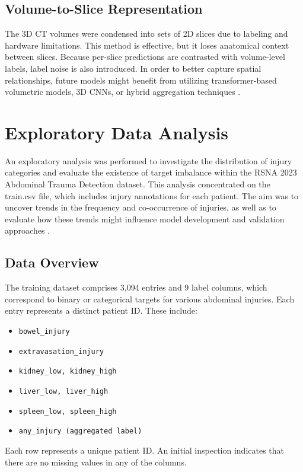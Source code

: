 \documentclass[a4paper,12pt]{article}
\begin{document}
\subsection{Volume-to-Slice Representation}
The 3D CT volumes were condensed into sets of 2D slices due to labeling and hardware limitations. This method is effective, but it loses anatomical context between slices. Because per-slice predictions are contrasted with volume-level labels, label noise is also introduced. In order to better capture spatial relationships, future models might benefit from utilizing transformer-based volumetric models, 3D CNNs, or hybrid aggregation techniques \cite{isensee2021nnunet}.

\section{Exploratory Data Analysis}
An exploratory analysis was performed to investigate the distribution of injury categories and evaluate the existence of target imbalance within the RSNA 2023 Abdominal Trauma Detection dataset. This analysis concentrated on the train.csv file, which includes injury annotations for each patient. The aim was to uncover trends in the frequency and co-occurrence of injuries, as well as to evaluate how these trends might influence model development and validation approaches \cite{ghosh2023eda}. 

\subsection{Data Overview}
The training dataset comprises 3,094 entries and 9 label columns, which correspond to binary or categorical targets for various abdominal injuries. Each entry represents a distinct patient ID. These include:
\begin{itemize}

    \item \verb|bowel_injury|
    \item \verb|extravasation_injury|
    \item \verb|kidney_low, kidney_high|
    \item \verb|liver_low, liver_high|
    \item \verb|spleen_low, spleen_high|
    \item \verb|any_injury (aggregated label)|
\end{itemize}
Each row represents a unique patient ID. An initial inspection indicates that there are no missing values in any of the columns.
\end{document}
